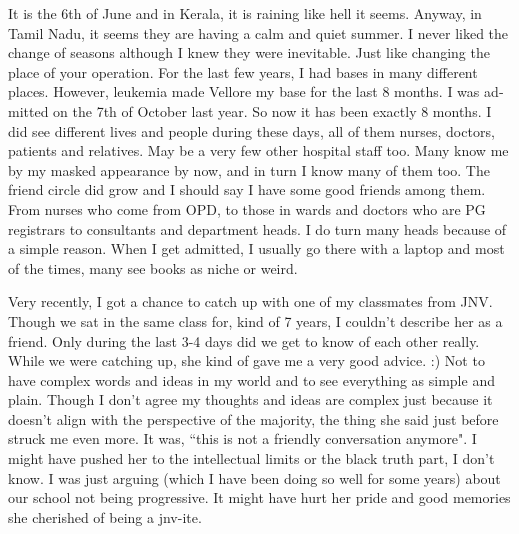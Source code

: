 \vskip 2pt
\begin{english}

It is the 6th of June and in Kerala, it is raining like hell it seems. Anyway, in Tamil Nadu, it seems they are having a calm and quiet summer. I never liked the change of seasons although I knew they were inevitable. Just like changing the place of your operation. For the last few years, I had bases in many different places. However, leukemia made Vellore my base for the last 8 months. I was admitted on the 7th of October last year. So now it has been exactly 8 months. I did see different lives and people during these days, all of them nurses, doctors, patients and relatives. May be a very few other hospital staff too. Many know me by my masked appearance by now, and in turn I know many of them too. The friend circle did grow and I should say I have some good friends among them. From nurses who come from OPD, to those in wards and doctors who are PG registrars to consultants and department heads. I do turn many heads because of a simple reason. When I get admitted, I usually go there with a laptop and most of the times, many see books as niche or weird. 

Very recently, I got a chance to catch up with one of my classmates from JNV. Though we sat in the same class for, kind of 7 years, I couldn't describe her as a friend. Only during the last 3-4 days did we get to know of each other really. While we were catching up, she kind of gave me a very good advice. :) Not to have complex words and ideas in my world and to see everything as simple and plain. Though I don't agree my thoughts and ideas are complex just because it doesn't align with the perspective of the majority, the thing she said just before struck me even more. It was, ``this is not a friendly conversation anymore". I might have pushed her to the intellectual limits or the black truth part, I don't know. I was just arguing (which I have been doing so well for some years) about our school not being progressive. It might have hurt her pride and good memories she cherished of being a jnv-ite.


\end{english}
